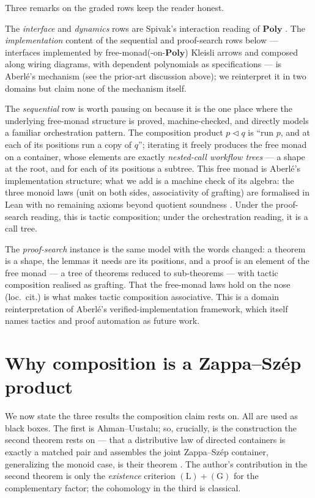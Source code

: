 \documentclass[11pt]{amsart}
\theoremstyle{definition}
\theoremstyle{remark}
\newcommand{\Poly}{\mathbf{Poly}}
\newcommand{\seq}{\triangleleft}
\begin{document}
\medskip
Three remarks on the graded rows keep the reader honest.

The \emph{interface} and \emph{dynamics} rows are Spivak's interaction reading of $\Poly$
\cite{NiuSpivak,SpivakRef}. The \emph{implementation} content of the sequential and
proof-search rows below --- interfaces implemented by free-monad(-on-$\Poly$) Kleisli arrows
and composed along wiring diagrams, with dependent polynomials as specifications --- is
Aberl\'e's mechanism \cite{aberle} (see the prior-art discussion above); we reinterpret it in
two domains but claim none of the mechanism itself.

The \emph{sequential} row is worth pausing on because it is the one place where the underlying
free-monad structure is proved, machine-checked, and directly models a familiar orchestration
pattern. The composition product $p\seq q$ is ``run $p$, and at each of its positions run a
copy of $q$''; iterating it freely produces the free monad on a container, whose elements are
exactly \emph{nested-call workflow trees} --- a shape at the root, and for each of its
positions a subtree. This free monad is Aberl\'e's implementation structure; what we add is a
machine check of its algebra: the three monoid laws (unit on both sides, associativity of
grafting) are formalised in Lean with no remaining axioms beyond quotient soundness
\cite{leanfree}. Under the proof-search reading, this is tactic composition; under the
orchestration reading, it is a call tree.

The \emph{proof-search} instance is the same model with the words changed: a theorem is a
shape, the lemmas it needs are its positions, and a proof is an element of the free monad --- a
tree of theorems reduced to sub-theorems --- with tactic composition realised as grafting.
That the free-monad laws hold on the nose (loc.\ cit.) is what makes tactic composition
associative. This is a domain reinterpretation of Aberl\'e's verified-implementation
framework, which itself names tactics and proof automation as future work.

\section{Why composition is a Zappa--Sz\'ep product}\label{sec:zs}

We now state the three results the composition claim rests on. All are used as black
boxes. The first is Ahman--Uustalu; so, crucially, is the construction the second theorem
rests on --- that a distributive law of directed containers is exactly a matched pair and
assembles the joint Zappa--Sz\'ep container, generalizing the monoid case, is their theorem
\cite{AhmanUustaluDL}. The author's contribution in the second theorem is only the
\emph{existence} criterion $\mathrm{(L)}+\mathrm{(G)}$ for the complementary factor; the
cohomology in the third is classical.
\end{document}

